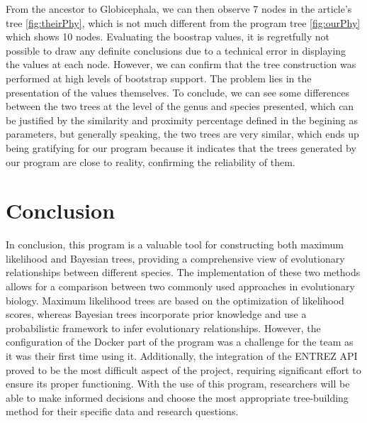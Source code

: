 \documentclass[12pt]{article}
\begin{document}
From the ancestor to Globicephala, we can then observe 7 nodes in the article's tree \ref{fig:theirPhy}, which is not much different from the program tree \ref{fig:ourPhy} which shows 10 nodes.\newline
Evaluating the boostrap values, it is regretfully not possible to draw any definite conclusions due to a technical error in displaying the values at each node. However, we can confirm that the tree construction was performed at high levels of bootstrap support. The problem lies in the presentation of the values themselves.\newline
To conclude, we can see some differences between the two trees at the level of the genus and species presented, which can be justified by the similarity and proximity percentage defined in the begining as parameters, but generally speaking, the two trees are very similar, which ends up being gratifying for our program because it indicates that the trees generated by our program are close to reality, confirming the reliability of them.
\newpage

\section{Conclusion}\label{sec:conclusoes}
In conclusion, this program is a valuable tool for constructing both maximum likelihood and Bayesian trees, providing a comprehensive view of evolutionary relationships between different species. The implementation of these two methods allows for a comparison between two commonly used approaches in evolutionary biology. Maximum likelihood trees are based on the optimization of likelihood scores, whereas Bayesian trees incorporate prior knowledge and use a probabilistic framework to infer evolutionary relationships. However, the configuration of the Docker part of the program was a challenge for the team as it was their first time using it. Additionally, the integration of the ENTREZ API proved to be the most difficult aspect of the project, requiring significant effort to ensure its proper functioning. With the use of this program, researchers will be able to make informed decisions and choose the most appropriate tree-building method for their specific data and research questions.
\end{document}
